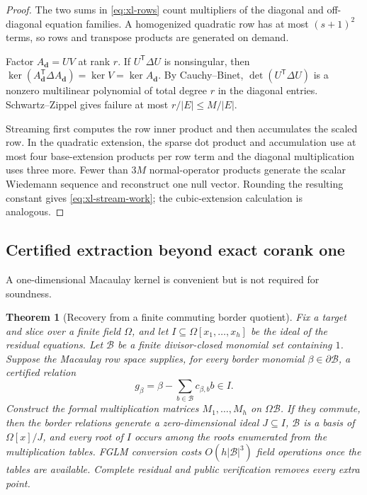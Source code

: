\documentclass[11pt]{article}
\newtheorem{theorem}{Theorem}[section]
\newcommand{\transpose}{\mathsf T}
\begin{document}
\begin{proof}
The two sums in \eqref{eq:xl-rows} count multipliers of the diagonal and
off-diagonal equation families.  A homogenized quadratic row has at most
$(s+1)^2$ terms, so rows and transpose products are generated on demand.

Factor $A_{\mathbf d}=UV$ at rank $r$.  If
$U^\transpose\Delta U$ is nonsingular, then
$\ker(A_{\mathbf d}^\transpose\Delta A_{\mathbf d})=\ker V=\ker A_{\mathbf d}$.
By Cauchy--Binet, $\det(U^\transpose\Delta U)$ is a nonzero multilinear
polynomial of total degree $r$ in the diagonal entries.  Schwartz--Zippel
gives failure at most $r/|E|\le M/|E|$.

Streaming first computes the row inner product and then accumulates the
scaled row.  In the quadratic extension, the sparse dot product and
accumulation use at most four base-extension products per row term and the
diagonal multiplication uses three more.  Fewer than $3M$ normal-operator
products generate the scalar Wiedemann sequence and reconstruct one null
vector.  Rounding the resulting constant gives
\eqref{eq:xl-stream-work}; the cubic-extension calculation is analogous.
\end{proof}

\subsection{Certified extraction beyond exact corank one}
A one-dimensional Macaulay kernel is convenient but is not required for
soundness.

\begin{theorem}[Recovery from a finite commuting border quotient]
\label{thm:border-recovery}
Fix a target and slice over a finite field $\Omega$, and let
$I\subseteq\Omega[x_1,\ldots,x_h]$ be the ideal of the residual equations.
Let $\mathcal B$ be a finite divisor-closed monomial set containing $1$.
Suppose the Macaulay row space supplies, for every border monomial
$\beta\in\partial\mathcal B$, a certified relation
\[
  g_\beta=\beta-\sum_{b\in\mathcal B}c_{\beta,b}b\in I.
\]
Construct the formal multiplication matrices $M_1,\ldots,M_h$ on
$\Omega\mathcal B$.  If they commute, then the border relations generate a
zero-dimensional ideal $J\subseteq I$, $\mathcal B$ is a basis of
$\Omega[x]/J$, and every root of $I$ occurs among the roots enumerated from
the multiplication tables.  FGLM conversion costs $O(h|\mathcal B|^3)$ field
operations once the tables are available.  Complete residual and public
verification removes every extra point.
\end{theorem}
\end{document}
